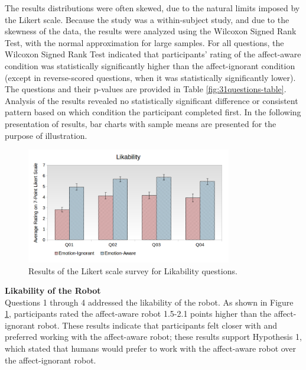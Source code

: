 \documentclass[12pt]{report}
\begin{document}
The results distributions were often skewed, due to the natural limits imposed
by the Likert scale. Because the study was a within-subject study, and due to
the skewness of the data, the results were analyzed using the Wilcoxon Signed
Rank Test, with the normal approximation for large samples. For all questions,
the Wilcoxon Signed Rank Test indicated that participants' rating of the
affect-aware condition was statistically significantly higher than the
affect-ignorant condition (except in reverse-scored questions, when it was
statistically significantly lower). The questions and their p-values are
provided in Table \ref{fig:31questions-table}. Analysis of the results revealed
no statistically significant difference or consistent pattern based on which
condition the participant completed first. In the following presentation of
results, bar charts with sample means are presented for the purpose of
illustration.

\begin{figure}[t]
 \centering
 \includegraphics[width=0.8\textwidth]{figure/Overall-Likability.png}
 \caption{Results of the Likert scale survey for Likability questions.}
 \label{fig:overall-likability}
\end{figure}

\hspace*{-8mm} \textbf{Likability of the Robot}
\label{sec:Likability}
\\Questions 1 through 4 addressed the likability of the robot. As shown in
Figure \ref{fig:overall-likability}, participants rated the affect-aware robot
1.5-2.1 points higher than the affect-ignorant robot. These results
indicate that participants felt closer with and preferred working with the
affect-aware robot; these results support Hypothesis 1, which stated that
humans would prefer to work with the affect-aware robot over the
affect-ignorant robot. \\
\end{document}
